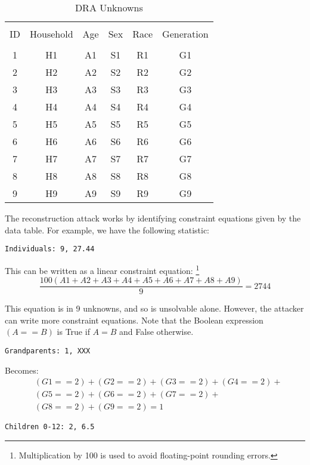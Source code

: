 \documentclass[jou,apacite]{apa6}
\begin{document}
\begin{table}[!htb]
\caption{DRA Unknowns}\label{tab6}
\begin{tabular}{c|c|c|c|c|c}
\hline\\[-1.5ex]
ID & Household & Age & Sex & Race & Generation \\[0.5ex]
\hline\\[-1.5ex]
1 & H1 & A1 & S1 & R1 & G1  \\[0.5ex]
2 & H2 & A2 & S2 & R2 & G2  \\[0.5ex]
3 & H3 & A3 & S3 & R3 & G3  \\[0.5ex]
4 & H4 & A4 & S4 & R4 & G4  \\[0.5ex]
5 & H5 & A5 & S5 & R5 & G5  \\[0.5ex]
6 & H6 & A6 & S6 & R6 & G6  \\[0.5ex]
7 & H7 & A7 & S7 & R7 & G7  \\[0.5ex]
8 & H8 & A8 & S8 & R8 & G8  \\[0.5ex]
9 & H9 & A9 & S9 & R9 & G9  \\[0.5ex]
\hline
\end{tabular}
\end{table}

The reconstruction attack works by identifying constraint
equations given by the data table. For example, we have the
following statistic:
\begin{verbatim}
Individuals: 9, 27.44
\end{verbatim}

This can be written as a linear constraint equation: \footnote{Multiplication by 100 is used to avoid floating-point rounding errors.}
\[\frac{100(A1 + A2 + A3 + A4 + A5 + A6 + A7 + A8 + A9)}{9} = 2744\]

This equation is in 9 unknowns, and so is unsolvable alone.
However, the attacker can write more constraint equations.
Note that the Boolean expression $(A == B)$ is True if $A = B$ and False otherwise.

\begin{verbatim}
Grandparents: 1, XXX
\end{verbatim}


Becomes:
\begin{align*}
& (G1==2) + (G2==2) + (G3==2) + (G4==2) + \\
& (G5==2)+ (G6==2) + (G7==2) +\\
& (G8==2) + (G9==2) = 1
\end{align*}

\begin{verbatim}
Children 0-12: 2, 6.5
\end{verbatim}
\end{document}
